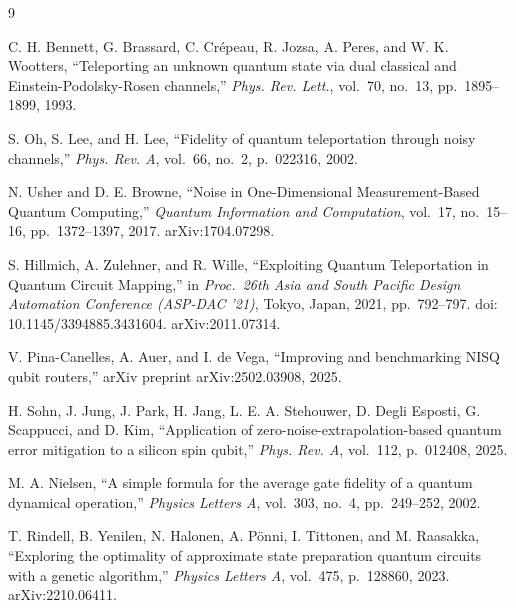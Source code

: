 \documentclass[11pt]{article}
\begin{document}

\begin{thebibliography}{9}

C. H. Bennett, G. Brassard, C. Cr\'epeau, R. Jozsa, A. Peres, and W. K. Wootters,
``Teleporting an unknown quantum state via dual classical and Einstein-Podolsky-Rosen channels,''
\textit{Phys. Rev. Lett.}, vol.\ 70, no.\ 13, pp.\ 1895--1899, 1993.

S. Oh, S. Lee, and H. Lee,
``Fidelity of quantum teleportation through noisy channels,''
\textit{Phys. Rev. A}, vol.\ 66, no.\ 2, p.\ 022316, 2002.

N. Usher and D. E. Browne,
``Noise in One-Dimensional Measurement-Based Quantum Computing,''
\textit{Quantum Information and Computation}, vol.\ 17, no.\ 15--16, pp.\ 1372--1397, 2017.
arXiv:1704.07298.

S. Hillmich, A. Zulehner, and R. Wille,
``Exploiting Quantum Teleportation in Quantum Circuit Mapping,''
in \textit{Proc.\ 26th Asia and South Pacific Design Automation Conference (ASP-DAC '21)}, Tokyo, Japan, 2021, pp.\ 792--797.
doi: 10.1145/3394885.3431604. arXiv:2011.07314.

V. Pina-Canelles, A. Auer, and I. de Vega,
``Improving and benchmarking NISQ qubit routers,''
arXiv preprint arXiv:2502.03908, 2025.

H. Sohn, J. Jung, J. Park, H. Jang, L. E. A. Stehouwer, D. Degli Esposti, G. Scappucci, and D. Kim,
``Application of zero-noise-extrapolation-based quantum error mitigation to a silicon spin qubit,''
\textit{Phys. Rev. A}, vol.\ 112, p.\ 012408, 2025.

M. A. Nielsen,
``A simple formula for the average gate fidelity of a quantum dynamical operation,''
\textit{Physics Letters A}, vol.\ 303, no.\ 4, pp.\ 249--252, 2002.

T. Rindell, B. Yenilen, N. Halonen, A. P\"onni, I. Tittonen, and M. Raasakka,
``Exploring the optimality of approximate state preparation quantum circuits with a genetic algorithm,''
\textit{Physics Letters A}, vol.\ 475, p.\ 128860, 2023. arXiv:2210.06411.

\end{thebibliography}
\end{document}
